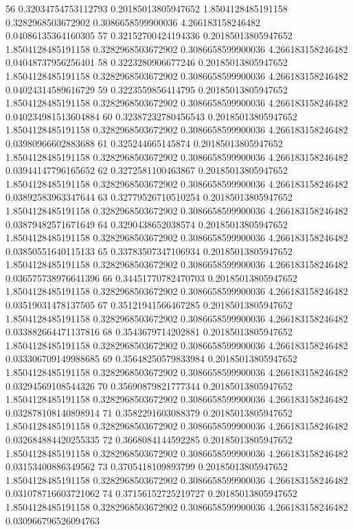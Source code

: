 {56 0.32034754753112793 0.20185013805947652 1.8504128485191158 0.3282968503672902 0.3086658599900036 4.266183158246482 0.04086135364160305
57 0.32152700424194336 0.20185013805947652 1.8504128485191158 0.3282968503672902 0.3086658599900036 4.266183158246482 0.04048737956256401
58 0.3223280906677246 0.20185013805947652 1.8504128485191158 0.3282968503672902 0.3086658599900036 4.266183158246482 0.04024314589616729
59 0.3223559856414795 0.20185013805947652 1.8504128485191158 0.3282968503672902 0.3086658599900036 4.266183158246482 0.040234981513604884
60 0.32387232780456543 0.20185013805947652 1.8504128485191158 0.3282968503672902 0.3086658599900036 4.266183158246482 0.03980966602883688
61 0.325244665145874 0.20185013805947652 1.8504128485191158 0.3282968503672902 0.3086658599900036 4.266183158246482 0.03944147796165652
62 0.3272581100463867 0.20185013805947652 1.8504128485191158 0.3282968503672902 0.3086658599900036 4.266183158246482 0.03892583963347644
63 0.32779526710510254 0.20185013805947652 1.8504128485191158 0.3282968503672902 0.3086658599900036 4.266183158246482 0.03879482571671649
64 0.3290438652038574 0.20185013805947652 1.8504128485191158 0.3282968503672902 0.3086658599900036 4.266183158246482 0.03850551640115133
65 0.33783507347106934 0.20185013805947652 1.8504128485191158 0.3282968503672902 0.3086658599900036 4.266183158246482 0.036575738976641396
66 0.34451770782470703 0.20185013805947652 1.8504128485191158 0.3282968503672902 0.3086658599900036 4.266183158246482 0.03519031478137505
67 0.35121941566467285 0.20185013805947652 1.8504128485191158 0.3282968503672902 0.3086658599900036 4.266183158246482 0.033882664471137816
68 0.3543679714202881 0.20185013805947652 1.8504128485191158 0.3282968503672902 0.3086658599900036 4.266183158246482 0.033306709149988685
69 0.35648250579833984 0.20185013805947652 1.8504128485191158 0.3282968503672902 0.3086658599900036 4.266183158246482 0.03294569108544326
70 0.35690879821777344 0.20185013805947652 1.8504128485191158 0.3282968503672902 0.3086658599900036 4.266183158246482 0.032878108140898914
71 0.3582291603088379 0.20185013805947652 1.8504128485191158 0.3282968503672902 0.3086658599900036 4.266183158246482 0.032684884420255335
72 0.3668084144592285 0.20185013805947652 1.8504128485191158 0.3282968503672902 0.3086658599900036 4.266183158246482 0.03153400886349562
73 0.3705418109893799 0.20185013805947652 1.8504128485191158 0.3282968503672902 0.3086658599900036 4.266183158246482 0.031078716603721062
74 0.37156152725219727 0.20185013805947652 1.8504128485191158 0.3282968503672902 0.3086658599900036 4.266183158246482 0.030966796526094763
}
